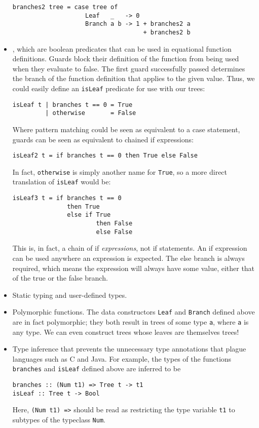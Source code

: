 \begin{itemize}
\begin{lstlisting}
branches2 tree = case tree of
                    Leaf   _   -> 0
                    Branch a b -> 1 + branches2 a
                                    + branches2 b
\end{lstlisting}
\item {}, which are boolean predicates that can be used in equational function definitions. Guards block their definition of the function from being used when they evaluate to false. The first guard successfully passed determines the branch of the function definition that applies to the given value. Thus, we could easily define an \lstinline{isLeaf} predicate for use with our trees:
\begin{lstlisting}
isLeaf t | branches t == 0 = True
         | otherwise       = False
\end{lstlisting}
Where pattern matching could be seen as equivalent to a case statement, guards can be seen as equivalent to chained if expressions:
\begin{lstlisting}
isLeaf2 t = if branches t == 0 then True else False
\end{lstlisting}
In fact, \lstinline{otherwise} is simply another name for \lstinline{True}, so a more direct translation of \lstinline{isLeaf} would be:
\begin{lstlisting}
isLeaf3 t = if branches t == 0
               then True
               else if True 
                       then False  
                       else False
\end{lstlisting}
This is, in fact, a chain of if \emph{expressions}, not if statements. An if expression can be used anywhere an expression is expected. The else branch is always required, which means the expression will always have some value, either that of the true or the false branch.
\item Static typing and user-defined types.
\item Polymorphic functions. The data constructors \lstinline{Leaf} and \lstinline{Branch} defined above are in fact polymorphic; they both result in trees of some type \lstinline{a}, where \lstinline{a} is any type. We can even construct trees whose leaves are themselves trees!
\item Type inference that prevents the unnecessary type annotations that plague languages such as C and Java. For example, the types of the functions \lstinline{branches} and \lstinline{isLeaf} defined above are inferred to be
\begin{lstlisting}
branches :: (Num t1) => Tree t -> t1
isLeaf :: Tree t -> Bool
\end{lstlisting}
Here, \lstinline{(Num t1) =>} should be read as restricting the type variable \lstinline{t1} to subtypes of the typeclass \lstinline{Num}.
\end{itemize}

